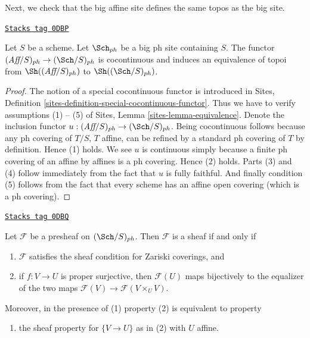 Next, we check that the big affine site defines the same
topos as the big site.

\begin{lemma}
\label{topologies-lemma-affine-big-site-ph}
\href{https://stacks.math.columbia.edu/tag/0DBP}{\texttt{Stacks tag 0DBP}}

Let $S$ be a scheme. Let $\Sch_{ph}$ be a big ph
site containing $S$.
The functor $(\textit{Aff}/S)_{ph} \to (\Sch/S)_{ph}$
is cocontinuous and induces an equivalence of topoi from
$\Sh((\textit{Aff}/S)_{ph})$ to
$\Sh((\Sch/S)_{ph})$.
\end{lemma}

\begin{proof}
The notion of a special cocontinuous functor is introduced in
Sites, Definition \ref{sites-definition-special-cocontinuous-functor}.
Thus we have to verify assumptions (1) -- (5) of
Sites, Lemma \ref{sites-lemma-equivalence}.
Denote the inclusion functor
$u : (\textit{Aff}/S)_{ph} \to (\Sch/S)_{ph}$.
Being cocontinuous follows because any ph covering of
$T/S$, $T$ affine, can be refined by a standard ph covering of $T$
by definition. Hence (1) holds. We see $u$ is continuous simply
because a finite ph covering of an affine by affines is a ph covering.
Hence (2) holds.
Parts (3) and (4) follow immediately from the fact that $u$ is
fully faithful. And finally condition (5) follows from the
fact that every scheme has an affine open covering (which is
a ph covering).
\end{proof}

\begin{lemma}
\label{topologies-lemma-characterize-sheaf}
\href{https://stacks.math.columbia.edu/tag/0DBQ}{\texttt{Stacks tag 0DBQ}}

Let $\mathcal{F}$ be a presheaf on $(\Sch/S)_{ph}$.
Then $\mathcal{F}$ is a sheaf if and only if
\begin{enumerate}
\item $\mathcal{F}$ satisfies the sheaf condition for
Zariski coverings, and
\item if $f : V \to U$ is proper surjective, then
$\mathcal{F}(U)$ maps bijectively to the equalizer
of the two maps $\mathcal{F}(V) \to \mathcal{F}(V \times_U V)$.
\end{enumerate}
Moreover, in the presence of (1) property (2) is equivalent to property
\begin{enumerate}
\item[(2')] the sheaf property for $\{V \to U\}$ as in (2) with $U$ affine.
\end{enumerate}
\end{lemma}

